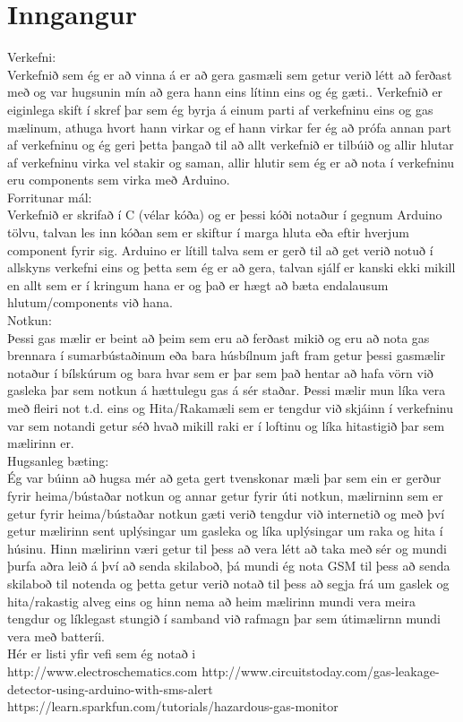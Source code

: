 \section{Inngangur}

Verkefni: \\
Verkefnið sem ég er að vinna á er að gera gasmæli sem getur verið létt að ferðast með og var hugsunin mín að gera hann eins lítinn eins og ég gæti.. Verkefnið er eiginlega skift í skref þar sem ég byrja á einum parti af verkefninu eins og gas mælinum, athuga hvort hann virkar og ef hann virkar fer ég að prófa annan part af verkefninu og ég geri þetta þangað til að allt verkefnið er tilbúið og allir hlutar af verkefninu virka vel stakir og saman, allir hlutir sem ég er að nota í verkefninu eru components sem virka með Arduino. \\

Forritunar mál: \\
Verkefnið er skrifað í C (vélar kóða) og er þessi kóði notaður í gegnum Arduino tölvu, talvan les inn kóðan sem er skiftur í marga hluta eða eftir hverjum component fyrir sig. Arduino er lítill talva sem er gerð til að get verið notuð í allskyns verkefni eins og þetta sem ég er að gera, talvan sjálf er kanski ekki mikill en allt sem er í kringum hana er og það er hægt að bæta endalausum hlutum/components við hana. \\

Notkun: \\
Þessi gas mælir er beint að þeim sem eru að ferðast mikið og eru að nota gas brennara í sumarbústaðinum eða bara húsbílnum jaft fram getur þessi gasmælir notaður í bílskúrum og bara hvar sem er þar sem það hentar að hafa vörn við gasleka þar sem notkun á hættulegu gas á sér staðar. Þessi mælir mun líka vera með fleiri not t.d. eins og Hita/Rakamæli sem er tengdur við skjáinn í verkefninu var sem notandi getur séð hvað mikill raki er í loftinu og líka hitastigið þar sem mælirinn er. \\

Hugsanleg bæting: \\
Ég var búinn að hugsa mér að geta gert tvenskonar mæli þar sem ein er gerður fyrir heima/bústaðar notkun og annar getur fyrir úti notkun, mælirninn sem er getur fyrir heima/bústaðar notkun gæti verið tengdur við internetið og með því getur mælirinn sent uplýsingar um gasleka og líka uplýsingar um raka og hita í húsinu. Hinn mælirinn væri getur til þess að vera létt að taka með sér og mundi þurfa aðra leið á því að senda skilaboð, þá mundi ég nota GSM til þess að senda skilaboð til notenda og þetta getur verið notað til þess að segja frá um gaslek og hita/rakastig alveg eins og hinn nema að heim mælirinn mundi vera meira tengdur og líklegast stungið í samband við rafmagn þar sem útimælirnn mundi vera með batteríi. \\

Hér er listi yfir vefi sem ég notað i\\
http://www.electroschematics.com \cite{DHT22}
http://www.circuitstoday.com/gas-leakage-detector-using-arduino-with-sms-alert \cite{Gasleak}
https://learn.sparkfun.com/tutorials/hazardous-gas-monitor \cite{Gasmon}

\begin{figure}[h]
\end{figure}